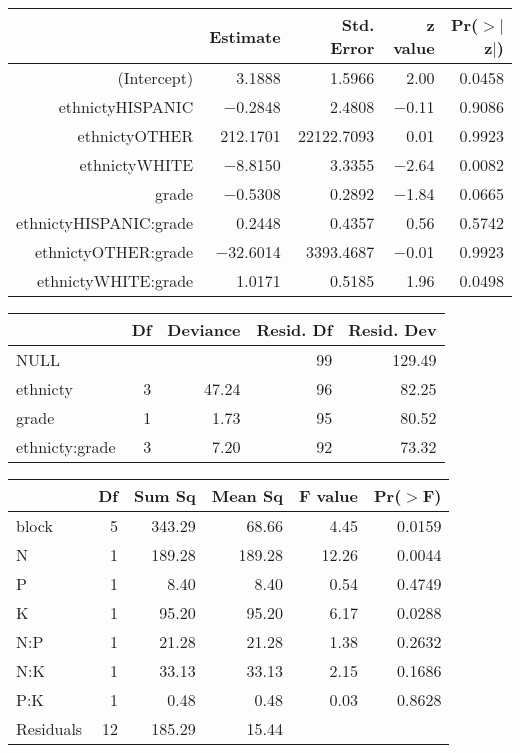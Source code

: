 \documentclass{article}
\begin{document}
\begin{table}[ht]
\begin{center}
\begin{tabular}{rrrrr}
\hline
 & Estimate & Std. Error & z value & Pr($>$$|$z$|$) \\
\hline
(Intercept) & 3.1888 & 1.5966 & 2.00 & 0.0458 \\
ethnictyHISPANIC & $-$0.2848 & 2.4808 & $-$0.11 & 0.9086 \\
ethnictyOTHER & 212.1701 & 22122.7093 & 0.01 & 0.9923 \\
ethnictyWHITE & $-$8.8150 & 3.3355 & $-$2.64 & 0.0082 \\
grade & $-$0.5308 & 0.2892 & $-$1.84 & 0.0665 \\
ethnictyHISPANIC:grade & 0.2448 & 0.4357 & 0.56 & 0.5742 \\
ethnictyOTHER:grade & $-$32.6014 & 3393.4687 & $-$0.01 & 0.9923 \\
ethnictyWHITE:grade & 1.0171 & 0.5185 & 1.96 & 0.0498 \\
\hline
\end{tabular}
\end{center}
\end{table}
\begin{table}[ht]
\begin{center}
\begin{tabular}{lrrrr}
\hline
 & Df & Deviance & Resid. Df & Resid. Dev \\
\hline
NULL &  &  & 99 & 129.49 \\
ethnicty & 3 & 47.24 & 96 & 82.25 \\
grade & 1 & 1.73 & 95 & 80.52 \\
ethnicty:grade & 3 & 7.20 & 92 & 73.32 \\
\hline
\end{tabular}
\end{center}
\end{table}
\begin{table}[ht]
\begin{center}
\begin{tabular}{lrrrrr}
\hline
 & Df & Sum Sq & Mean Sq & F value & Pr($>$F) \\
\hline
block & 5 & 343.29 & 68.66 & 4.45 & 0.0159 \\
N & 1 & 189.28 & 189.28 & 12.26 & 0.0044 \\
P & 1 & 8.40 & 8.40 & 0.54 & 0.4749 \\
K & 1 & 95.20 & 95.20 & 6.17 & 0.0288 \\
N:P & 1 & 21.28 & 21.28 & 1.38 & 0.2632 \\
N:K & 1 & 33.13 & 33.13 & 2.15 & 0.1686 \\
P:K & 1 & 0.48 & 0.48 & 0.03 & 0.8628 \\
Residuals & 12 & 185.29 & 15.44 &  &  \\
\hline
\end{tabular}
\end{center}
\end{table}
\end{document}
